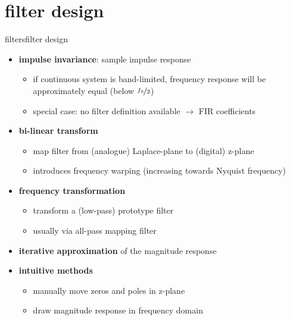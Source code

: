     \section{filter design}
		\begin{frame}{filters}{filter design}
            \vspace{-5mm}
            \begin{itemize}
                \item   \textbf{impulse invariance}: sample impulse response
                    \begin{itemize}
                        \item   if continuous system is band-limited, frequency response will be approximately equal (below $\nicefrac{f_\mathrm{S}}{2}$)
                        \item   special case: no filter definition available $\rightarrow$ FIR coefficients 
                    \end{itemize}
                \pause
                \item   \textbf{bi-linear transform}
                    \begin{itemize}
                        \item   map filter from (analogue) Laplace-plane to (digital) z-plane
                        \item   introduces frequency warping (increasing towards Nyquist frequency)
                    \end{itemize}
                \pause
                \item   \textbf{frequency transformation}
                    \begin{itemize}
                        \item   transform a (low-pass) prototype filter
                        \item   usually via all-pass mapping filter
                    \end{itemize}
                \pause
                \item   \textbf{iterative approximation} of the magnitude response
                \pause
                \item   \textbf{intuitive methods}
                    \begin{itemize}
                        \item   manually move zeros and poles in z-plane
                        \item   draw magnitude response in frequency domain
                    \end{itemize}
            \end{itemize}
 		\end{frame}
